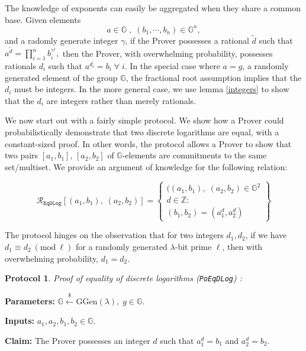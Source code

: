 \documentclass[11pt, lettersize, notitlepage, leqno, footskip=0.6cm]{article}
\newcommand{\ttt}{\texttt}
\newcommand{\bG}{\mathbb{G}}
\newcommand{\wti}{\widetilde}
\newcommand{\mc}{\mathcal}
\newcommand{\mb}{\mathbb}
\newcommand{\mr}{\mathrm}
\newcommand{\lam}{\lambda}
\newcommand{\lamb}{\lambda}
\newcommand{\vs}{\vspace{-0.15cm}}
\newcommand{\noin}{\noindent}
\newcommand{\op}{overwhelming probability}
\newcommand{\Mod}[1]{\ (\mathrm{mod}\ #1)}
\newtheorem{Prot}[Thm]{Protocol}
\numberwithin{equation}{section}
\begin{document}
The knowledge of exponents can easily be aggregated when they share a common base. Given elements \vs $$a\in\mb{G}\;,\;(b_1,\cdots,b_n)\in\mb{G}^n, $$ and a radomly generate integer $\gamma$, if the Prover possesses a rational $\wti{d}$ such that $a^{\wti{d}} = \prod_{i=1}^n b_i^{\gamma^i},$ then the Prover, with overwhelming probability, possesses rationals $d_i$ such that $a^{d_i} = b_i\;\forall\;i$. In the special case where $a = g$, a randomly generated element of the group $\bG$, the fractional root assumption implies that the $d_i$ must be integers. In the more general case, we use lemma \ref{integers} to show that the $d_i$ are integers rather than merely rationals.

We now start out with a fairly simple protocol. We show how a Prover could probabilistically demonstrate that two discrete logarithms are equal, with a constant-sized proof. In other words, the protocol allows a Prover to show that two pairs $[a_1, b_1]$, $[a_2, b_2]$ of $\bG$-elements are commitments to the same set/multiset. We provide an argument of knowledge for  the following relation:\vs

\[
  \mc{R}_{\ttt{EqDLog}}[(a_1, b_1),\;(a_2,b_2)] = \left\{\begin{array}{l}
    ((a_1, b_1),\; (a_2,b_2)\in\mb{G}^2\\
    d\in\mb{Z}: \\
    (b_1,b_2) = (a_1^d,a_2^d)
  \end{array}\right\}
\] \vspace{0.1cm}

\noin The protocol hinges on the observation that for two integers $d_1,d_2$, if we have $d_1\equiv d_2\Mod{\ell}$ for a randomly generated $\lam$-bit prime $\ell$, then with \op, $d_1= d_2$.

\vspace{0.15cm}


\begin{Prot}\label{EqDLog} \normalfont \textit{Proof of equality of discrete logarithms} (\verb|PoEqDLog|) :\end{Prot} \vspace{-0.3cm}

\noindent \textbf{Parameters:} $\mb{G}\xleftarrow{\$} \mr{GGen}(\lamb), \; g\in \mb{G}$.

\noindent \textbf{Inputs:} $a_1, a_2, b_1, b_2 \in \mb{G}$.

\noindent \textbf{Claim:} The Prover possesses an integer $d$ such that $a_1^d = b_1$ and $a_2^d = b_2$.
\end{document}

